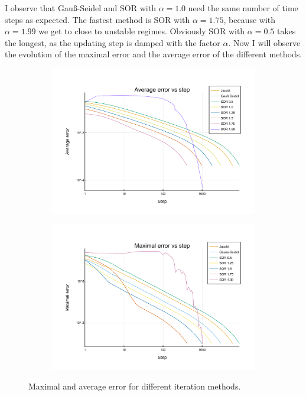 \documentclass[
	a4paper, %
	10pt, %
]{CSUniSchoolLabReport}
\begin{document}
I observe that Gauß-Seidel and SOR with $\alpha=1.0$ need the same number of time steps as expected. The fastest method is SOR with  $\alpha=1.75$, because with $\alpha=1.99$ we get to close to unstable regimes. Obviously SOR with $\alpha=0.5$ takes the longest, as the updating step is damped with the factor $\alpha$. Now I will observe the evolution of the maximal error and the average error of the different methods.

\begin{figure}[H]
	\centering
	\begin{subfigure}[b]{0.49\textwidth}
			\centering
			\includegraphics[width=\textwidth]{../saves_t1/av_errors_comp.pdf}
			\label{fig:av_errors}
	\end{subfigure}
	\hfill
	\begin{subfigure}[b]{0.49\textwidth}
			\centering
			\includegraphics[width=\textwidth]{../saves_t1/max_errors_comp.pdf}
			\label{fig:max_errors}
	\end{subfigure}
	\caption{Maximal and average error for different iteration methods.}
	\label{fig:errors}
\end{figure}
\end{document}
